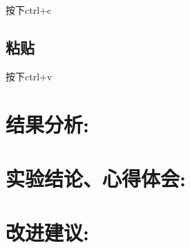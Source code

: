 \documentclass[a4paper,11pt,UTF8,AutoFakeBold= {2.88}]{ctexart}
\begin{document}
按下ctrl+c

\subsection{粘贴}

按下ctrl+v

\section{结果分析:}


\section{实验结论、心得体会:}


\section{改进建议:}



\clearpage
\end{document}
